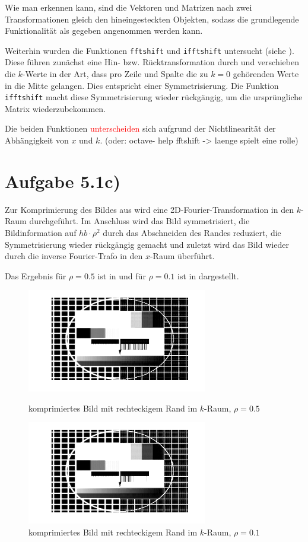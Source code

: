 Wie man erkennen kann, sind die Vektoren und Matrizen nach zwei Transformationen
gleich den hineingesteckten Objekten, sodass die grundlegende Funktionalität als
gegeben angenommen werden kann.

Weiterhin wurden die Funktionen \texttt{fftshift} und \texttt{ifftshift}
untersucht (siehe ). Diese führen zunächst eine Hin- bzw. Rücktransformation
durch und verschieben die $k$-Werte in der Art, dass pro Zeile und Spalte die 
zu $k=0$ gehörenden Werte in die Mitte gelangen. Dies entspricht einer Symmetrisierung.
Die Funktion \texttt{ifftshift} macht diese Symmetrisierung wieder rückgängig, um
die ursprüngliche Matrix wiederzubekommen.

Die beiden Funktionen \textcolor{red}{unterscheiden} sich aufgrund der Nichtlinearität der Abhängigkeit
von $x$ und $k$. (oder: octave- help fftshift -> laenge spielt eine rolle)


\section*{Aufgabe 5.1c)}
Zur Komprimierung des Bildes aus  wird eine 2D-Fourier-Transformation
in den $k$-Raum durchgeführt. Im Anschluss wird das Bild symmetrisiert, die Bildinformation
auf $hb\cdot ρ^2$ durch das Abschneiden des Randes reduziert, die Symmetrisierung wieder
rückgängig gemacht und zuletzt wird das Bild wieder durch die inverse Fourier-Trafo in den
$x$-Raum überführt.

Das Ergebnis für $ρ=0.5$ ist in  und für $ρ=0.1$ ist in  dargestellt.

\begin{figure}[htb]
\centering
  \includegraphics[width=0.7\textwidth,keepaspectratio]{../tmp/eins_c_0_5}
  \caption{komprimiertes Bild mit rechteckigem Rand im $k$-Raum, $ρ=0.5$}
  \label{fig:1c5}
  \includegraphics[width=0.7\textwidth,keepaspectratio]{../tmp/eins_c_0_1}
  \caption{komprimiertes Bild mit rechteckigem Rand im $k$-Raum, $ρ=0.1$}
  \label{fig:1c1}
\end{figure}

